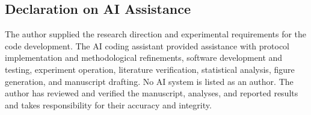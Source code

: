 \documentclass{svproc}
\begin{document}
\FloatBarrier
\begin{samepage}
  
\section*{Declaration on AI Assistance}
The author supplied the research direction and experimental requirements for the code development.
The AI coding assistant provided assistance with protocol implementation and methodological
refinements, software development and testing, experiment operation, literature
verification, statistical analysis, figure generation, and manuscript drafting.
No AI system is listed as an author. The author has reviewed and verified the manuscript, analyses, and reported results and takes responsibility for their accuracy and integrity.
\end{samepage}
\end{document}
